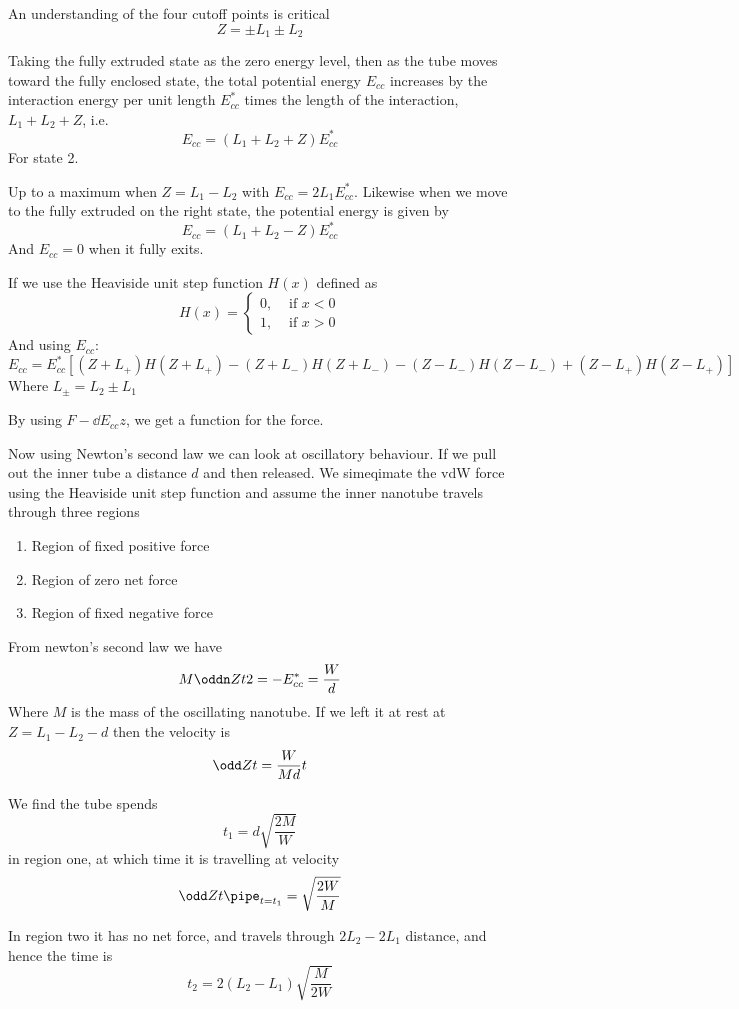 \documentclass{X:/Documents/Coding/Latex/myassignment}
\begin{document}
An understanding of the four cutoff points is critical
\[Z = \pm L_1 \pm L_2\]

Taking the fully extruded state as the zero energy level, then as the tube moves toward the fully enclosed state, the total potential energy $E_{cc}$ increases by the interaction energy per unit length $E_{cc}^*$ times the length of the interaction, $L_1 + L_2 + Z$, i.e.
\[E_{cc} = \left(L_1 + L_2 + Z\right) E_{cc}^*\]
For state 2.

Up to a maximum when $Z = L_1 - L_2$ with $E_{cc} = 2L_1 E_{cc}^*$. Likewise when we move to the fully extruded on the right state, the potential energy is given by
\[E_{cc} = \left(L_1 + L_2 - Z\right) E_{cc}^*\]
And $E_{cc} =0$ when it fully exits.

If we use the Heaviside unit step function $H(x)$ defined as
\[H(x) = \begin{cases}
	0, &\text{ if }x < 0\\
	1, &\text{ if }x > 0
\end{cases}\]
And using $E_{cc}$:
\[E_{cc} = E_{cc}^* \left[(Z + L_+) H(Z+L_+) - (Z+L_-) H(Z + L_-) - (Z-L_-) H(Z-L_-) + (Z-L_+) H(Z-L_+)\right]\]
Where $L_\pm = L_2 \pm L_1$

By using $F - \dd{E_{cc}}z$, we get a function for the force.


Now using Newton's second law we can look at oscillatory behaviour. If we pull out the inner tube a distance $d$ and then released. 
We simeqimate the vdW force using the Heaviside unit step function and assume the inner nanotube travels through three regions
\begin{enumerate}
	\item Region of fixed positive force
	\item Region of zero net force
	\item Region of fixed negative force
\end{enumerate}

From newton's second law we have
\[M \oddn Zt2 = -E_{cc}^* = \frac{W}{d}\]
Where $M$ is the mass of the oscillating nanotube. 
If we left it at rest at $Z = L_1 - L_2 - d$ then the velocity is
\[\odd Zt = \frac{W}{Md}t\]

We find the tube spends
\[t_1 = d\sqrt{\frac{2M}{W}}\]
in region one, at which time it is travelling at velocity
\[\odd Zt \pipe_{t=t_1} = \sqrt{\frac{2W}{M}}\]


In region two it has no net force, and travels through $2L_2 - 2L_1$ distance, and hence the time is
\[t_2 = 2(L_2 - L_1) \sqrt{\frac{M}{2W}}\]
\end{document}
